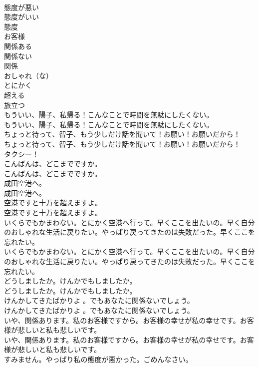\documentclass[8pt]{extreport}
\begin{document}
\begin{CJK}{UTF8}{min}
\\	態度が悪い
\\	態度がいい
\\	態度
\\	お客様
\\	関係ある
\\	関係ない
\\	関係
\\	おしゃれ（な）
\\	とにかく
\\	超える
\\	旅立つ
\\	もういい、陽子、私帰る！こんなことで時間を無駄にしたくない。	
\\	もういい、陽子、私帰る！こんなことで時間を無駄にしたくない。 
\\	ちょっと待って、智子、もう少しだけ話を聞いて！お願い！お願いだから！	
\\	ちょっと待って、智子、もう少しだけ話を聞いて！お願い！お願いだから！ 
\\	タクシー！	
\\	こんばんは、どこまでですか。	
\\	こんばんは、どこまでですか。 
\\	成田空港へ。	
\\	成田空港へ。 
\\	空港ですと十万を超えますよ。	
\\	空港ですと十万を超えますよ。 
\\	いくらでもかまわない。とにかく空港へ行って。早くここを出たいの。早く自分のおしゃれな生活に戻りたい。やっぱり戻ってきたのは失敗だった。早くここを忘れたい。	
\\	いくらでもかまわない。とにかく空港へ行って。早くここを出たいの。早く自分のおしゃれな生活に戻りたい。やっぱり戻ってきたのは失敗だった。早くここを忘れたい。 
\\	どうしましたか。けんかでもしましたか。	
\\	どうしましたか。けんかでもしましたか。 
\\	けんかしてきたばかりよ 。でもあなたに関係ないでしょう。	
\\	けんかしてきたばかりよ 。でもあなたに関係ないでしょう。 
\\	いや、関係あります。私のお客様ですから。お客様の幸せが私の幸せです。お客様が悲しいと私も悲しいです。	
\\	いや、関係あります。私のお客様ですから。お客様の幸せが私の幸せです。お客様が悲しいと私も悲しいです。 
\\	すみません。やっぱり私の態度が悪かった。ごめんなさい。	

\end{CJK}
\end{document}
